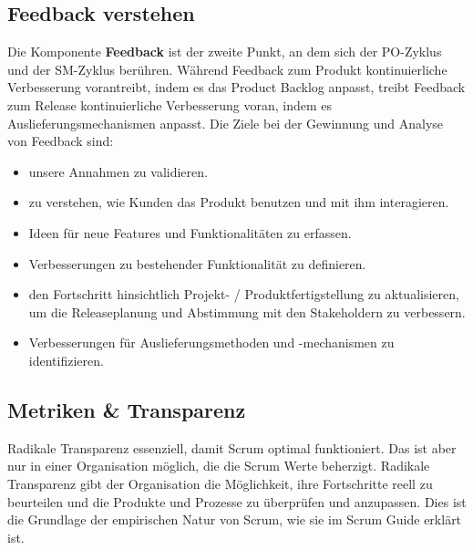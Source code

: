 \documentclass[12pt,a4paper,parskip=full]{scrartcl}
\begin{document}
\subsection{Feedback verstehen}
Die Komponente \textbf{Feedback} ist der zweite Punkt, an dem sich der PO-Zyklus
und der SM-Zyklus berühren. Während Feedback zum Produkt kontinuierliche
Verbesserung vorantreibt, indem es das Product Backlog anpasst, treibt Feedback
zum Release kontinuierliche Verbesserung voran, indem es Auslieferungsmechanismen
anpasst. Die Ziele bei der Gewinnung und Analyse von Feedback sind:
\begin{itemize}
\item unsere Annahmen zu validieren.
\item zu verstehen, wie Kunden das Produkt benutzen und mit ihm interagieren.
\item Ideen für neue Features und Funktionalitäten zu erfassen.
\item Verbesserungen zu bestehender Funktionalität zu definieren.
\item den Fortschritt hinsichtlich Projekt- / Produktfertigstellung zu aktualisieren, um die Releaseplanung und Abstimmung mit den Stakeholdern zu verbessern.
\item Verbesserungen für Auslieferungsmethoden und -mechanismen zu identifizieren.
\end{itemize}

\subsection{Metriken \& Transparenz}
Radikale Transparenz essenziell, damit Scrum optimal funktioniert. Das ist aber
nur in einer Organisation möglich, die die Scrum Werte beherzigt. Radikale
Transparenz gibt der Organisation die Möglichkeit, ihre Fortschritte reell zu
beurteilen und die Produkte und Prozesse zu überprüfen und anzupassen. Dies ist
die Grundlage der empirischen Natur von Scrum, wie sie im Scrum Guide erklärt ist.
\end{document}
